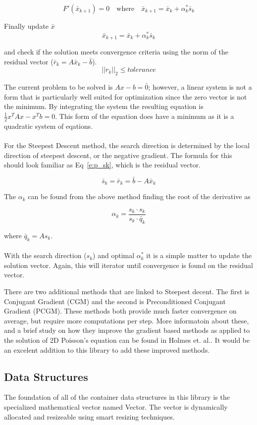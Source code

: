 \documentclass[]{aiaa-tc}%
\begin{document}
$$
   F'(\bar x_{k+1}) = 0 \quad \textrm{where} \quad \bar x_{k+1} = \bar x_{k} + \alpha_k^{*} \bar s_k
$$


Finally update $\bar x$
$$
   \bar x_{k+1} = \bar x_{k} + \alpha_k^{*} \bar s_k
$$

and check if the solution meets convergence criteria using the norm of the
residual vector ($\bar r_k = A \bar x_k - \bar b$).
$$
\vert\vert r_k \vert\vert_2 \leq tolerance
$$

The current problem to be solved is $Ax-b=\bar 0$; however, a linear system is not a form that
is particularly well suited for optimization since the zero vector is not the
minimum. By integrating the system the resulting equation is $\frac{1}{2} x^T A x - x^T b = 0$.
This form of the equation does have a minimum as it is a quadratic system of eqations.
\\\\
For the Steepest Descent method, the search direction is determined by the local
direction of steepest descent, or the negative gradient. The formula for this should look
familiar as Eq~\ref{e:p_sk}, which is the residual vector.

\begin{equation}
  \label{e:p_sk}
  \bar s_k = \bar r_k = \bar b - A \bar x_k
\end{equation}

The $\alpha_k$ can be found from the above method finding the root of the derivative
as

$$
  \alpha_k = \frac{s_k \cdotp s_k}{s_k \cdotp \bar q_k}
$$

where $\bar q_k = A s_k$.
\\\\
With the search direction ($s_k$) and optimal $\alpha_k^*$ it is a simple matter
to update the solution vector. Again, this will iterator until convergence is
found on the residual vector.

There are two additional methods that are linked to Steepest decent. The first is
Conjugant Gradient (CGM) and the second is Preconditioned Conjugant Gradient (PCGM).
These methods both provide much faster convergence on average, but require more computations
per step. More informatoin about these, and a brief study on how they improve the
gradient based methods as applied to the solution of 2D Poisson's equation
can be found in Holmes et. al.\cite{holmes:07bk}. It would be an excelent addition
to this library to add these improved methods.

\FloatBarrier\subsection{Data Structures}
The foundation of all of the container data structures in this library is the 
specialized mathematical vector named Vector. The vector is dynamically allocated 
and resizeable using smart resizing techniques.
\end{document}
